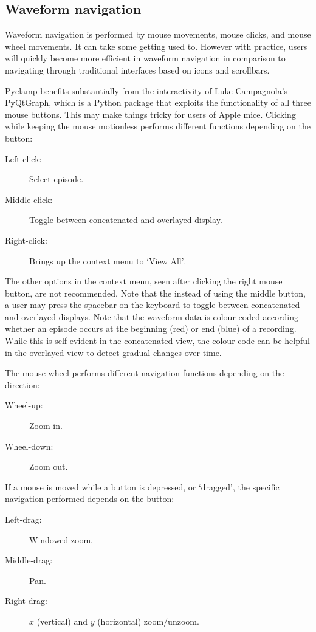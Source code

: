 \documentclass{article}
\begin{document}
\subsection{Waveform navigation}

Waveform navigation is performed by mouse movements, mouse clicks, and mouse wheel movements. It can take some getting
used to. However with practice, users will quickly become more efficient in waveform navigation in comparison to
navigating through traditional interfaces based on icons and scrollbars. 

Pyclamp benefits substantially from the interactivity of Luke Campagnola's PyQtGraph, which is a Python package that
exploits the functionality of all three mouse buttons. This may make things tricky for users of Apple mice. Clicking
while keeping the mouse motionless performs different functions depending on the button: 

\begin{description}
	\item[Left-click:] Select episode.
	\item[Middle-click:] Toggle between concatenated and overlayed display.
  \item[Right-click:] Brings up the context menu to `View All'.
\end{description}

The other options in the context menu, seen after clicking the right mouse button, are not recommended. Note that the
instead of using the middle button, a user may press the spacebar on the keyboard to toggle between concatenated and
overlayed displays. Note that the waveform data is colour-coded according whether an episode occurs at the beginning
(red) or end (blue) of a recording. While this is self-evident in the concatenated view, the colour code can be helpful
in the overlayed view to detect gradual changes over time.

The mouse-wheel performs different navigation functions depending on the direction:

\begin{description}
	\item[Wheel-up:] Zoom in.
	\item[Wheel-down:] Zoom out.
\end{description}

If a mouse is moved while a button is depressed, or `dragged', the specific navigation performed depends on the button:

\begin{description}
	\item[Left-drag:] Windowed-zoom.
	\item[Middle-drag:] Pan.
  \item[Right-drag:] $x$ (vertical) and $y$ (horizontal) zoom/unzoom.
\end{description}
\end{document}
